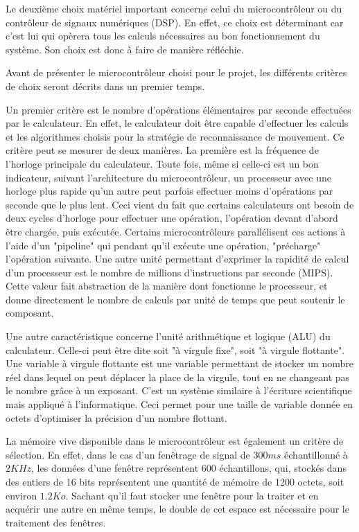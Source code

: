 \documentclass[letterpaper, twoside, 12pt, memoire, creativecommons, hyperref]{thETS}
\begin{document}
Le deuxième choix matériel important concerne celui du microcontrôleur ou du contrôleur de signaux numériques (DSP). En effet, ce choix est déterminant car c'est lui qui opèrera tous les calculs nécessaires au bon fonctionnement du système. Son choix est donc à faire de manière réfléchie. 

Avant de présenter le microcontrôleur choisi pour le projet, les différents critères de choix seront décrits dans un premier temps. 

Un premier critère est le nombre d'opérations élémentaires par seconde effectuées par le calculateur. En effet, le calculateur doit être capable d'effectuer les calculs et les algorithmes choisis pour la stratégie de reconnaissance de mouvement. Ce critère peut se mesurer de deux manières. La première est la fréquence de l'horloge principale du calculateur. Toute fois, même si celle-ci est un bon indicateur, suivant l'architecture du microcontrôleur, un processeur avec une horloge plus rapide qu'un autre peut parfois effectuer moins d'opérations par seconde que le plus lent. Ceci vient du fait que certains calculateurs ont besoin de deux cycles d'horloge pour effectuer une opération, l'opération devant d'abord être chargée, puis exécutée. Certains microcontrôleurs parallélisent ces actions à l'aide d'un "pipeline" qui pendant qu'il exécute une opération, "précharge" l'opération suivante. Une autre unité permettant d'exprimer la rapidité de calcul d'un processeur est le nombre de millions d'instructions par seconde (MIPS). Cette valeur fait abstraction de la manière dont fonctionne le processeur, et donne directement le nombre de calculs par unité de temps que peut soutenir le composant.

Une autre caractéristique concerne l'unité arithmétique et logique (ALU) du calculateur. Celle-ci peut être dite soit "à virgule fixe", soit "à virgule flottante". Une variable à virgule flottante est une variable permettant de stocker un nombre réel dans lequel on peut déplacer la place de la virgule, tout en ne changeant pas le nombre grâce à un exposant. C'est un système similaire à l'écriture scientifique mais appliqué à l'informatique. Ceci permet pour une taille de variable donnée en octets d'optimiser la précision d'un nombre flottant.

La mémoire vive disponible dans le microcontrôleur est également un critère de sélection. En effet, dans le cas d'un fenêtrage de signal de $300 ms$ échantillonné à $2 KHz$, les données  d'une fenêtre représentent 600 échantillons, qui, stockés dans des entiers de 16 bits représentent une quantité de mémoire de 1200 octets, soit environ $1.2 Ko$. Sachant qu'il faut stocker une fenêtre pour la traiter et en acquérir une autre en même temps, le double de cet espace est nécessaire pour le traitement des fenêtres. 
\end{document}
